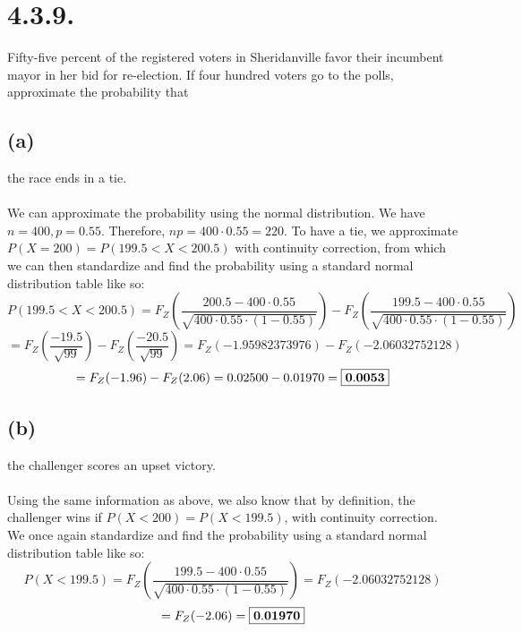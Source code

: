\documentclass{article}
\begin{document}
{\section*{4.3.9.}
Fifty-five percent of the registered voters in Sheridanville favor their incumbent mayor in her bid for re-election. If four hundred voters go to the polls, approximate the probability that

\subsection*{(a)} 
the race ends in a tie.
\\
\\
We can approximate the probability using the normal distribution. We have \(n = 400, p = 0.55\). Therefore, \(np = 400 \cdot 0.55 = 220\). To have a tie, we approximate \(P(X = 200) = P(199.5 < X < 200.5)\) with continuity correction, from which we can then standardize and find the probability using a standard normal distribution table like so: 
\[
P(199.5 < X < 200.5) = F_Z(\frac{200.5 - 400 \cdot 0.55}{\sqrt{400 \cdot 0.55 \cdot (1-0.55)}}) - F_Z(\frac{199.5 - 400 \cdot 0.55}{\sqrt{400 \cdot 0.55 \cdot (1-0.55)}})
\]
\[
= F_Z(\frac{-19.5}{\sqrt{99}}) - F_Z(\frac{-20.5}{\sqrt{99}}) = F_Z(-1.95982373976) - F_Z(-2.06032752128)
\]
\[
= F_Z(-1.96) - F_Z(2.06) = 0.02500 - 0.01970 = \fbox{\(\mathbf{0.0053}\)}
\]

\subsection*{(b)} 
the challenger scores an upset victory.
\\
\\
Using the same information as above, we also know that by definition, the challenger wins if \(P(X < 200) = P(X < 199.5)\), with continuity correction. We once again standardize and find the probability using a standard normal distribution table like so:
\[
P(X < 199.5) = F_Z(\frac{199.5 - 400 \cdot 0.55}{\sqrt{400 \cdot 0.55 \cdot (1 - 0.55)}}) = F_Z(-2.06032752128) 
\] 
\[
= F_Z(-2.06) = \fbox{\(\mathbf{0.01970}\)}
\]

}
\end{document}
